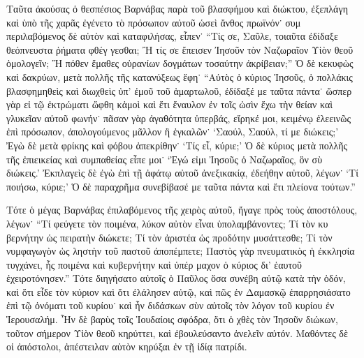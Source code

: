 Ταῦτα ἀκούσας ὁ θεσπέσιος Βαρνάβας παρὰ τοῦ
βλασφήμου καὶ διώκτου, ἐξεπλάγη καὶ ὑπὸ τῆς χαρᾶς
ἐγένετο τὸ πρόσωπον αὐτοῦ ὡσεὶ ἄνθος πρωϊνόν˙ συμ%
περιλαβόμενος δὲ αὐτὸν καὶ καταφιλήσας, εἶπεν˙ \enquote{Τίς
σε, Σαῦλε, τοιαῦτα ἐδίδαξε θεόπνευστα ῥήματα φθέγ%
γεσθαι; Ἢ τίς σε ἔπεισεν Ἰησοῦν τὸν Ναζωραῖον Υἱὸν
θεοῦ ὁμολογεῖν; Ἢ πόθεν ἔμαθες οὐρανίων δογμάτων
τοσαύτην ἀκρίβειαν;} Ὁ δὲ κεκυφὼς καὶ δακρύων, μετὰ
πολλῆς τῆς κατανύξεως ἔφη˙ \enquote{Αὐτὸς ὁ κύριος Ἰησοῦς,
ὁ πολλάκις βλασφημηθεὶς καὶ διωχθεὶς ὑπ’ ἐμοῦ τοῦ
ἁμαρτωλοῦ, ἐδίδαξέ με ταῦτα πάντα˙ ὥσπερ γὰρ εἰ
τῷ ἐκτρώματι ὤφθη κἀμοὶ καὶ ἔτι ἔναυλον ἐν τοῖς ὠσὶν
ἔχω τὴν θείαν καὶ γλυκεῖαν αὐτοῦ φωνήν˙ πᾶσαν γὰρ
ἀγαθότητα ὑπερβάς, εἴρηκέ μοι, κειμένῳ ἐλεεινῶς ἐπὶ
πρόσωπον, ἀπολογούμενος μᾶλλον ἢ ἐγκαλῶν˙ \enquote{Σαούλ,
Σαούλ, τί με διώκεις;} Ἐγὼ δὲ μετὰ φρίκης καὶ φόβου
ἀπεκρίθην˙ \enquote{Τίς εἶ, κύριε;} Ὁ δὲ κύριος μετὰ πολλῆς
τῆς ἐπιεικείας καὶ συμπαθείας εἶπε μοι˙ \enquote{Ἐγώ εἰμι Ἰησοῦς
ὁ Ναζωραῖος, ὃν σὺ διώκεις.} Ἐκπλαγεὶς δὲ ἐγὼ ἐπὶ
τῇ ἀφάτῳ αὐτοῦ ἀνεξικακίᾳ, ἐδεήθην αὐτοῦ, λέγων˙ \enquote{Τί
ποιήσω, κύριε;} Ὁ δὲ παραχρῆμα συνεβίβασέ με ταῦτα
πάντα καὶ ἔτι πλείονα τούτων.}

Τότε ὁ μέγας Βαρνάβας ἐπιλαβόμενος τῆς χειρὸς αὐτοῦ,
ἤγαγε πρὸς τοὺς ἀποστόλους, λέγων˙ \enquote{Τί φεύγετε τὸν
ποιμένα, λύκον αὐτὸν εἶναι ὑπολαμβάνοντες; Τί τὸν κυ%
βερνήτην ὡς πειρατὴν διώκετε; Τί τὸν ἀριστέα ὡς
προδότην μυσάττεσθε; Τί τὸν νυμφαγωγὸν ὡς ληστὴν
τοῦ παστοῦ ἀποπέμπετε; Παστὸς γὰρ πνευματικὸς ἡ
ἐκκλησία τυγχάνει, ἧς ποιμένα καὶ κυβερνήτην καὶ ὑπέρ%
μαχον ὁ κύριος δι’ ἑαυτοῦ ἐχειροτόνησεν.} Τότε διηγήσατο
αὐτοῖς ὁ Παῦλος ὅσα συνέβη αὐτῷ κατὰ τὴν ὁδόν, καὶ
ὅτι εἶδε τὸν κύριον καὶ ὅτι ἐλάλησεν αὐτῷ, καὶ πῶς
ἐν Δαμασκῷ ἐπαρρησιάσατο ἐπὶ τῷ ὀνόματι τοῦ κυρίου˙
καὶ ἦν διδάσκων σὺν αὐτοῖς τὸν λόγον τοῦ κυρίου ἐν
Ἱερουσαλήμ. Ἦν δὲ βαρὺς τοῖς Ἰουδαίοις σφόδρα, ὅτι
ὁ χθὲς τὸν Ἰησοῦν διώκων, τοῦτον σήμερον Υἱὸν θεοῦ
κηρύττει, καὶ ἐβουλεύσαντο ἀνελεῖν αὐτόν. Μαθόντες δὲ
οἱ ἀπόστολοι, ἀπέστειλαν αὐτὸν κηρύξαι ἐν τῇ ἰδίᾳ
πατρίδι.

